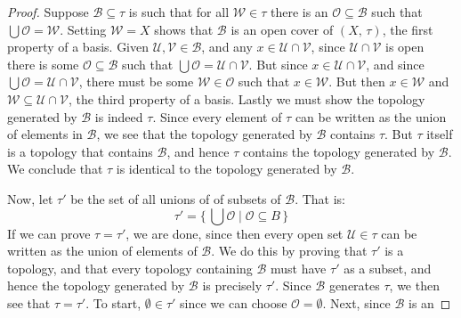 \documentclass{article}
\theoremstyle{plain}
\theoremstyle{normal}
\begin{document}
        \begin{proof}
            Suppose $\mathcal{B}\subseteq\tau$ is such that for all
            $\mathcal{W}\in\tau$ there is an $\mathcal{O}\subseteq\mathcal{B}$
            such that $\bigcup\mathcal{O}=\mathcal{W}$. Setting
            $\mathcal{W}=X$ shows that $\mathcal{B}$ is an open cover of
            $(X,\,\tau)$, the first property of a basis. Given
            $\mathcal{U},\mathcal{V}\in\mathcal{B}$, and any
            $x\in\mathcal{U}\cap\mathcal{V}$, since $\mathcal{U}\cap\mathcal{V}$
            is open there is some $\mathcal{O}\subseteq\mathcal{B}$ such that
            $\bigcup\mathcal{O}=\mathcal{U}\cap\mathcal{V}$. But since
            $x\in\mathcal{U}\cap\mathcal{V}$, and since
            $\bigcup\mathcal{O}=\mathcal{U}\cap\mathcal{V}$, there must be some
            $\mathcal{W}\in\mathcal{O}$ such that $x\in\mathcal{W}$. But then
            $x\in\mathcal{W}$ and
            $\mathcal{W}\subseteq\mathcal{U}\cap\mathcal{V}$, the third property
            of a basis. Lastly we must show the topology generated by
            $\mathcal{B}$ is indeed $\tau$. Since every element of $\tau$ can
            be written as the union of elements in $\mathcal{B}$, we see that
            the topology generated by $\mathcal{B}$ contains $\tau$. But $\tau$
            itself is a topology that contains $\mathcal{B}$, and hence $\tau$
            contains the topology generated by $\mathcal{B}$. We conclude that
            $\tau$ is identical to the topology generated by $\mathcal{B}$.
            \par\hfill\par
            Now, let $\tau'$ be the set of all unions of of subsets of
            $\mathcal{B}$. That is:
            \begin{equation}
                \tau'=\{\,\bigcup\mathcal{O}\;|\;\mathcal{O}\subseteq{B}\,\}
            \end{equation}
            If we can prove $\tau=\tau'$, we are done, since then every open
            set $\mathcal{U}\in\tau$ can be written as the union of elements of
            $\mathcal{B}$. We do this by proving that $\tau'$ is a topology, and
            that every topology containing $\mathcal{B}$ must have $\tau'$ as
            a subset, and hence the topology generated by $\mathcal{B}$ is
            precisely $\tau'$. Since $\mathcal{B}$ generates $\tau$, we then
            see that $\tau=\tau'$. To start, $\emptyset\in\tau'$ since we can
            choose $\mathcal{O}=\emptyset$. Next, since $\mathcal{B}$ is an

\end{proof}
\end{document}
